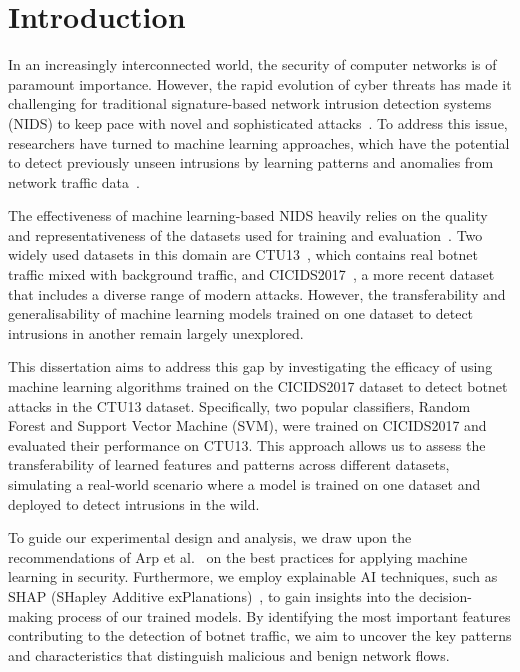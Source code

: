 \chapter{Introduction}
In an increasingly interconnected world, the security of computer networks is of paramount importance. However, the rapid evolution of cyber threats has made it challenging for traditional signature-based network intrusion detection systems (NIDS) to keep pace with novel and sophisticated attacks~\cite{marchetti2016analysis}. To address this issue, researchers have turned to machine learning approaches, which have the potential to detect previously unseen intrusions by learning patterns and anomalies from network traffic data~\cite{buczak2015survey}.

The effectiveness of machine learning-based NIDS heavily relies on the quality and representativeness of the datasets used for training and evaluation~\cite{engelen2021troubleshooting}. Two widely used datasets in this domain are CTU13~\cite{garcia2014empirical}, which contains real botnet traffic mixed with background traffic, and CICIDS2017~\cite{sharafaldin2018toward}, a more recent dataset that includes a diverse range of modern attacks. However, the transferability and generalisability of machine learning models trained on one dataset to detect intrusions in another remain largely unexplored.

This dissertation aims to address this gap by investigating the efficacy of using machine learning algorithms trained on the CICIDS2017 dataset to detect botnet attacks in the CTU13 dataset. Specifically, two popular classifiers, Random Forest and Support Vector Machine (SVM), were trained on CICIDS2017 and evaluated their performance on CTU13. This approach allows us to assess the transferability of learned features and patterns across different datasets, simulating a real-world scenario where a model is trained on one dataset and deployed to detect intrusions in the wild.

To guide our experimental design and analysis, we draw upon the recommendations of Arp et al.~\cite{arp2022and} on the best practices for applying machine learning in security. Furthermore, we employ explainable AI techniques, such as SHAP (SHapley Additive exPlanations)~\cite{lundberg2017unified}, to gain insights into the decision-making process of our trained models. By identifying the most important features contributing to the detection of botnet traffic, we aim to uncover the key patterns and characteristics that distinguish malicious and benign network flows.

